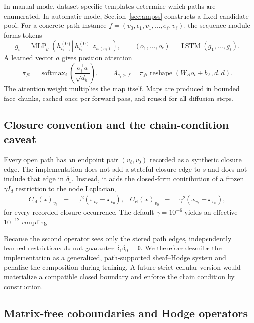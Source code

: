 \documentclass{article}
\newcommand{\transpose}{\mathsf{T}}
\newcommand{\concat}{\mathbin\Vert}
\begin{document}
In manual mode, dataset-specific templates determine which paths are enumerated. In automatic
mode, Section~\ref{sec:ampss} constructs a fixed candidate pool. For a concrete path instance
$f=(v_0,e_1,v_1,\ldots,e_\ell,v_\ell)$, the sequence module forms tokens
\begin{equation}
  g_i=\operatorname{MLP}_{g}\!
  \left(h_{v_{i-1}}^{(0)}\concat h_{v_i}^{(0)}\concat z_{\psi(e_i)}\right),
  \qquad (o_1,\ldots,o_\ell)=\operatorname{LSTM}(g_1,\ldots,g_\ell).
\end{equation}
A learned vector $a$ gives position attention
\begin{equation}
  \pi_{fi}=\operatorname{softmax}_{i}\left(\frac{o_i^{\transpose}a}{\sqrt{d_h}}\right),
  \qquad
  A_{e_i\triangleright f}=\pi_{fi}\operatorname{reshape}(W_Ao_i+b_A,d,d).
  \label{eq:face-map}
\end{equation}
The attention weight multiplies the map itself. Maps are produced in bounded face chunks, cached
once per forward pass, and reused for all diffusion steps.

\subsection{Closure convention and the chain-condition caveat}
\label{sec:closure}

Every open path has an endpoint pair $(v_\ell,v_0)$ recorded as a synthetic closure edge. The
implementation does not add a stateful closure edge to $s$ and does not include that edge in
$\delta_1$. Instead, it adds the closed-form contribution of a frozen $\gamma I_d$ restriction to
the node Laplacian,
\begin{align}
  C_{\mathrm{cl}}(x)_{v_\ell} &\mathrel{+}=\gamma^2(x_{v_\ell}-x_{v_0}), &
  C_{\mathrm{cl}}(x)_{v_0} &\mathrel{-}=\gamma^2(x_{v_\ell}-x_{v_0}),
  \label{eq:closure}
\end{align}
for every recorded closure occurrence. The default $\gamma=10^{-6}$ yields an effective
$10^{-12}$ coupling.

Because the second operator sees only the stored path edges, independently learned restrictions do
not guarantee $\delta_1\delta_0=0$. We therefore describe the implementation as a generalized,
path-supported sheaf--Hodge system and penalize the composition during training. A future strict
cellular version would materialize a compatible closed boundary and enforce the chain condition by
construction.

\subsection{Matrix-free coboundaries and Hodge operators}
\end{document}
